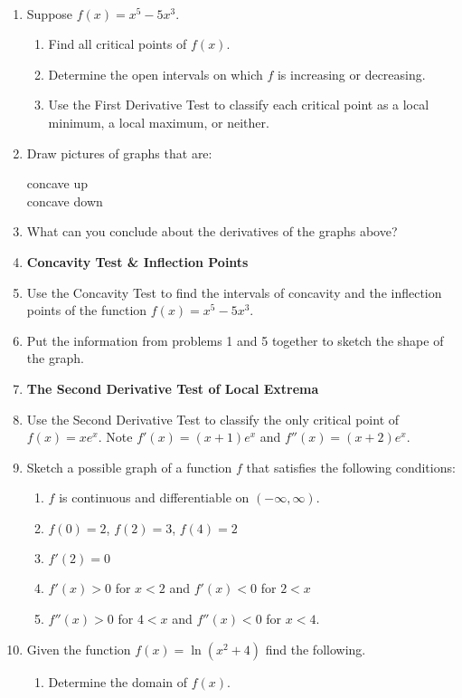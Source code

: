 \documentclass[11pt,fleqn]{article}
\begin{document}
\begin{center}
  \large
  \\
\end{center}
\begin{enumerate}
\item Suppose $f(x)=x^5-5x^3.$ 
	\begin{enumerate}
	\item Find all critical points of $f(x).$
	\vspace{1in}
	\item Determine the open  intervals on which $f$ is increasing or decreasing.
	\vspace{1.5in}
	\item Use the First Derivative Test to classify each critical point as a local minimum, a local maximum, or neither.
	\vspace{1.5in}
	\end{enumerate}
\item Draw pictures of graphs that are:
\begin{multicols}{2}
concave up \\

\columnbreak
concave down \\
\end{multicols}
\vfill
\item What can you conclude about the derivatives of the graphs above?
\newpage
\item \textbf{Concavity Test \& Inflection Points}
\vfill
\item Use the Concavity Test to find the intervals of concavity and the inflection points of the function $f(x)=x^5-5x^3.$
\vfill
\item Put the information from problems 1 and 5 together to sketch the shape of the graph.
\vfill
\newpage
\item \textbf{The Second Derivative Test of Local Extrema}
\vspace{2in}

\item Use the Second Derivative Test to classify the only critical point of $f(x)=xe^x.$ Note $f'(x)=(x+1)e^x$ and $f''(x)=(x+2)e^x.$
\vfill
\item Sketch a possible graph of a function $f$ that
satisfies the following conditions:
  \begin{enumerate}
  \item $f$ is continuous and differentiable on $(-\infty,\infty).$
  \item $f(0) = 2$, $f(2) = 3$, $f(4) = 2$
  \item $f'(2) =0$
  \item $f'(x) > 0$ for $ x < 2$ and $f'(x) < 0$ for $2 < x$
     \item $f''(x) > 0$ for $4<x$ and $f''(x) < 0$ for $x <4$. 
  \end{enumerate}
  \vspace{3in}
  \newpage
\item Given the function $f(x) = \ln(x^2 + 4)$ find the
following. 
\begin{enumerate}
\item Determine the domain of $f(x).$\\


\end{enumerate}
\end{enumerate}
\end{document}
